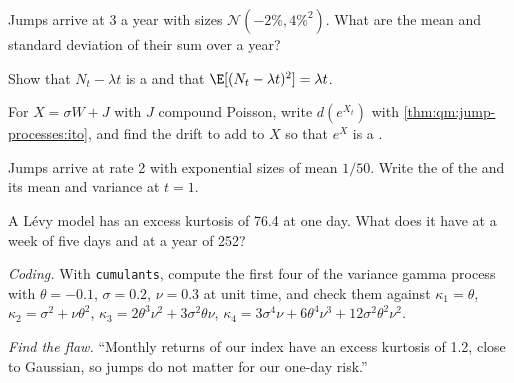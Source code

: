 \begin{exercise}[$\star$]\label{exo:qm:jump-processes:2}
Jumps arrive at 3 a year with sizes $\mathcal N(-2\%, 4\%^2)$. What are the mean and standard deviation of their
sum over a year?
\end{exercise}

\begin{exercise}[$\star$]\label{exo:qm:jump-processes:3}
Show that $N_t - \lambda t$ is a  and that $\E[(N_t - \lambda t)^2] = \lambda t$.
\end{exercise}

\begin{exercise}[$\star\star$]\label{exo:qm:jump-processes:4}
For $X = \sigma W + J$ with $J$ compound Poisson, write $d(e^{X_t})$ with \cref{thm:qm:jump-processes:ito}, and
find the drift to add to $X$ so that $e^X$ is a .
\end{exercise}

\begin{exercise}[$\star\star$]\label{exo:qm:jump-processes:5}
Jumps arrive at rate 2 with exponential sizes of mean $1/50$. Write the  of the
 and its mean and variance at $t = 1$.
\end{exercise}

\begin{exercise}[$\star\star$]\label{exo:qm:jump-processes:6}
A Lévy model has an excess kurtosis of 76.4 at one day. What does it have at a week of five days and at
a year of 252?
\end{exercise}

\begin{exercise}[$\star\star\star$]\label{exo:qm:jump-processes:7}
\emph{Coding.} With \texttt{cumulants}, compute the first four  of the variance gamma process
with $\theta = -0.1$, $\sigma = 0.2$, $\nu = 0.3$ at unit time, and check them against $\kappa_1 = \theta$, $\kappa_2 = \sigma^2 +
\nu\theta^2$, $\kappa_3 = 2\theta^3\nu^2 + 3\sigma^2\theta\nu$, $\kappa_4 = 3\sigma^4\nu + 6\theta^4\nu^3 + 12\sigma^2\theta^2\nu^2$.
\end{exercise}

\begin{exercise}[$\star\star\star$]\label{exo:qm:jump-processes:8}
\emph{Find the flaw.} ``Monthly returns of our index have an excess kurtosis of 1.2, close to Gaussian,
so jumps do not matter for our one-day risk.''
\end{exercise}

